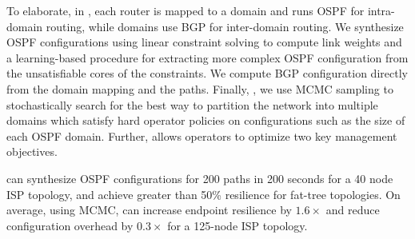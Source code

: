 To elaborate, in \name, each router is mapped to a domain and runs
OSPF for intra-domain routing, while domains use BGP for inter-domain
routing. 
We synthesize OSPF configurations using linear constraint solving to compute
link weights and 
a learning-based procedure for extracting more complex OSPF configuration from
the unsatisfiable cores of the constraints.
We compute BGP configuration directly from the domain mapping and the paths.
Finally, , we use MCMC sampling to stochastically search for the best way to
partition the network into multiple domains which satisfy hard
operator policies on configurations such as  the size of each OSPF
domain. Further, \name allows operators to optimize two key management
objectives. 

\name can synthesize OSPF configurations for 200 paths in 200
seconds for a 40 node ISP topology, and achieve greater than 
50\% resilience for fat-tree topologies.
 On average, using MCMC, \name can increase
endpoint resilience by $1.6\times$ and 
reduce configuration overhead
by $0.3\times$
for a 125-node ISP topology.



